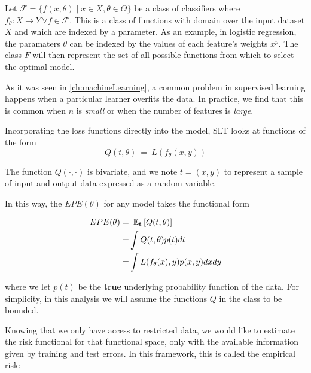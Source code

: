 \begin{appendices}

Let $\mathcal {F} = \big \{ f(x,\theta) \mid x \in X, \theta \in \Theta \big \}$ be a class of classifiers where $f_\theta: X \rightarrow Y \, \forall f \in \mathcal {F}$.
This is a class of functions with domain over the input dataset $X$ and which are indexed by a parameter.
As an example, in logistic regression, the paramaters $\theta$ can be indexed by the values of each feature's weights $x^p$.
The class $F$ will then represent the set of all possible functions from which to select the optimal model.

As it was seen in \cref{ch:machineLearning}, a common problem in supervised learning happens when a particular learner overfits the data.
In practice, we find that this is common when $n$ is \textit{small} or when the number of features is \textit{large}.

Incorporating the loss functions directly into the model, SLT looks at functions of the form $$Q(t,\theta) \ = \ L(f_\theta(x,y))$$

The function $Q(\cdot,\cdot)$ is bivariate, and we note $t=(x,y)$ to represent a sample of input and output data expressed as a random variable.%

In this way, the $EPE(\theta)$ for any model takes the functional form


\begin{equation}
\begin{split}
EPE(\theta) = & \ \operatorname{\mathbb{E}}_{\textbf{t}} \left[ Q(t,\theta) \right]\\
= & \int Q(t,\theta) p(t) dt \\
= & \int L(f_\theta(x),y) p(x,y) dx dy
\end{split}
\end{equation}\label{eq:vapnik-risk}

where we let $p(t)$ be the \textbf{true} underlying probability function of the data.
For simplicity, in this analysis we will assume the functions $Q$ in the class to be bounded.

Knowing that we only have access to restricted data, we would like to estimate the risk functional for that functional space, only with the available information given by training and test errors.
In this framework, this is called the empirical risk:


\end{appendices}
